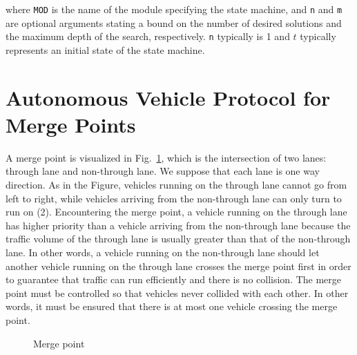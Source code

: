 \documentclass[10pt, conference, compsocconf]{IEEEtran}
\begin{document}
\noindent
where \verb!MOD! is the name of the module specifying the state
machine, and \verb!n! and \verb!m! are optional arguments stating a
bound on the number of desired solutions and the maximum depth of the
search, respectively.  \verb!n! typically is 1 and $t$ typically
represents an initial state of the state machine.

 

 
\section{Autonomous Vehicle Protocol for Merge Points}
 \label{sect_oriproto}
A merge point is visualized in Fig.~\ref{mergePoint_fig}, which is the intersection of two lanes: through lane and non-through lane.
We suppose that each lane is one way direction.
As in the Figure, vehicles running on the through lane cannot go from left to right, while vehicles arriving from the non-through lane can only turn to run on (2).
Encountering the merge point, a vehicle running on the through lane has higher priority than a vehicle arriving from the non-through lane because the traffic volume of the through lane is usually greater than that of the non-through lane. 
In other words, a vehicle running on the non-through lane should let another vehicle running on the through lane crosses the merge point first in order to guarantee that traffic can run efficiently and there is no collision.
The merge point must be controlled so that vehicles never collided with each other. 
In other words, it must be ensured that there is at most one vehicle crossing the merge point.


\begin{figure}[h]
\begin{center}
\end{center}
\caption{Merge point}
\label{mergePoint_fig}
\end{figure}
\end{document}
